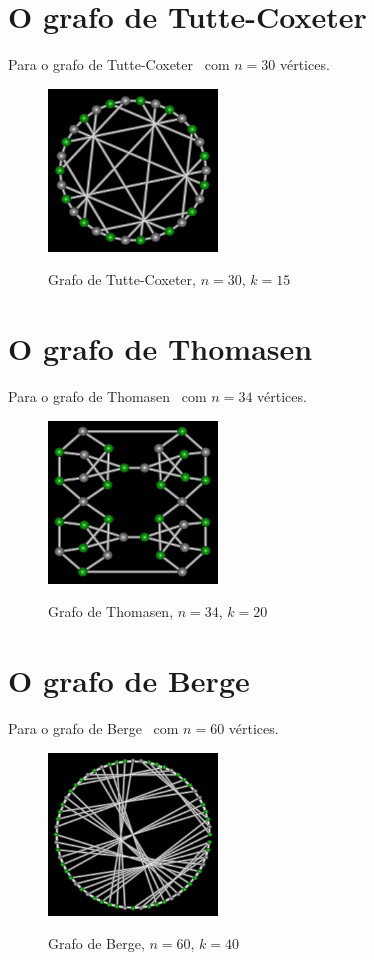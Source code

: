 \section{O grafo de Tutte-Coxeter}
Para o grafo de Tutte-Coxeter~\cite{cite:example-tutte} com $n=30$
vértices.

\begin{figure}[htb]
\centering
\includegraphics[width=0.4\textwidth]{img/tutte.png}
\label{fig:example-tutte}
\caption{Grafo de Tutte-Coxeter, $n=30$, $k=15$}
\end{figure}


\section{O grafo de Thomasen}
Para o grafo de Thomasen~\cite{cite:example-thomasen} com $n=34$
vértices.

\begin{figure}[htb]
\centering
\includegraphics[width=0.4\textwidth]{img/thomasen.png}
\label{fig:example-thomasen}
\caption{Grafo de Thomasen, $n=34$, $k=20$}
\end{figure}


\section{O grafo de Berge}
Para o grafo de Berge~\cite{cite:example-berge} com $n=60$ vértices.

\begin{figure}[htb]
\centering
\includegraphics[width=0.4\textwidth]{img/berge.png}
\label{fig:example-berge}
\caption{Grafo de Berge, $n=60$, $k=40$}
\end{figure}


